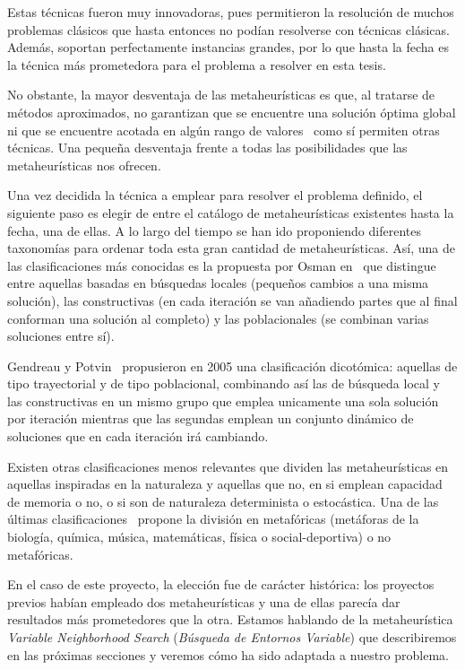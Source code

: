 Estas técnicas fueron muy innovadoras, pues permitieron la resolución de muchos problemas clásicos que hasta entonces no podían resolverse con técnicas clásicas. Además, soportan perfectamente instancias grandes, por lo que hasta la fecha es la técnica más prometedora para el problema a resolver en esta tesis.

No obstante, la mayor desventaja de las metaheurísticas es que, al tratarse de métodos aproximados, no garantizan que se encuentre una solución óptima global ni que se encuentre acotada en algún rango de valores~\cite{sota:metaheuristicas-design-impl} como sí permiten otras técnicas. Una pequeña desventaja frente a todas las posibilidades que las metaheurísticas nos ofrecen.
 
Una vez decidida la técnica a emplear para resolver el problema definido, el siguiente paso es elegir de entre el catálogo de metaheurísticas existentes hasta la fecha, una de ellas. A lo largo del tiempo se han ido proponiendo diferentes taxonomías para ordenar toda esta gran cantidad de metaheurísticas. 
Así, una de las clasificaciones más conocidas es la propuesta por Osman en~\cite{metaheuristicas:taxonomia1} que distingue entre aquellas basadas en búsquedas locales (pequeños cambios a una misma solución), las constructivas (en cada iteración se van añadiendo partes que al final conforman una solución al completo) y las poblacionales (se combinan varias soluciones entre sí). 

Gendreau y Potvin~\cite{metaheuristicas:taxonomia2} propusieron en 2005 una clasificación dicotómica: aquellas de tipo trayectorial y de tipo poblacional, combinando así las de búsqueda local y las constructivas en un mismo grupo que emplea unicamente una sola solución por iteración mientras que las segundas emplean un conjunto dinámico de soluciones que en cada iteración irá cambiando. 

Existen otras clasificaciones menos relevantes que dividen las metaheurísticas en aquellas inspiradas en la naturaleza y aquellas que no, en si emplean capacidad de memoria o no, o si son de naturaleza determinista o estocástica. Una de las últimas clasificaciones~\cite{sota:metaheuristicas} propone la división en metafóricas (metáforas de la biología, química, música, matemáticas, física o social-deportiva) o no metafóricas.

En el caso de este proyecto, la elección fue de carácter histórica: los proyectos previos habían empleado dos metaheurísticas y una de ellas parecía dar resultados más prometedores que la otra. Estamos hablando de la metaheurística \textit{Variable Neighborhood Search} (\textit{Búsqueda de Entornos Variable}) que describiremos en las próximas secciones y veremos cómo ha sido adaptada a nuestro problema.

